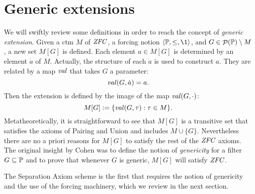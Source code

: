 \section{Generic extensions}

We will swiftly review some definitions in order to reach the concept
of \emph{generic extension}. Given a ctm $M$ of $\mathit{ZFC}$, a forcing
notion $\lb\PP,\leq,\1\rb$, and 
$G\in\mathop{\mathcal{P}}(\mathbb{P})\setminus M$, a new set $M[G]$ is defined. Each element $a\in M[G]$ is
determined by an element $\dot a$ of $M$. Actually, the structure of
each $\dot a$ is used to construct $a$. They are related by a
map $\operatorname{\mathit{val}}$ that takes $G$ a parameter:
\[
\operatorname{\mathit{val}}(G,\dot a) = a.
\] 
Then the extension is defined by the image of the map $\operatorname{\mathit{val}}(G,\cdot)$:
\[
M[G] \mathrel{\mathop:}= \{\operatorname{\mathit{val}}(G,\tau): \tau\in M\}.
\]
Metatheoretically, it is straightforward to see that $M[G]$ is a
transitive set that satisfies the axioms of Pairing and Union and
includes $M\cup\{G\}$. Nevertheless there are no a priori reasons for
$M[G]$ to satisfy the rest of the $\mathit{ZFC}$ 
axioms. The original insight by Cohen was to define the notion of
\emph{genericity} for a filter $G\subseteq\mathbb{P}$ and to prove that whenever
$G$ is generic, $M[G]$ will satisfy $\mathit{ZFC}$.

The Separation Axiom scheme is the first that requires the notion of
genericity and the use of the forcing machinery, which we review in
the next section.

